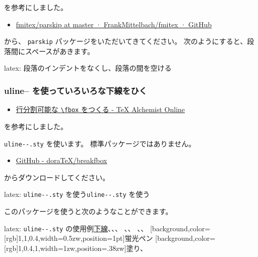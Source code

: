 \documentclass[dvipdfmx,a4j,14pt,uplatex]{jsarticle}
\begin{document}
を参考にしました。

\begin{itemize}
\item \href{https://github.com/FrankMittelbach/fmitex/tree/master/parskip}{fmitex/parskip at master · FrankMittelbach/fmitex · GitHub}
\end{itemize}

から、 \texttt{parskip} パッケージをいただいてきてください。
次のようにすると、段落間にスペースがあきます。


\begin{programlist}[label={orgb4fd86c}]{latex}{: 段落のインデントをなくし、段落の間を空ける}%
\usepackage[skip=1.2em]{parskip}
\end{programlist}

\subsubsection{uline-- を使っていろいろな下線をひく}
\label{sec:org8b065a0}

\begin{itemize}
\item \href{http://doratex.hatenablog.jp/entry/20171219/1513609345}{行分割可能な \texttt{\textbackslash{}fbox} をつくる - \TeX{} Alchemist Online}
\end{itemize}

を参考にしました。

\texttt{uline-{}-.sty} を使います。
標準パッケージではありません。

\begin{itemize}
\item \href{https://github.com/doraTeX/breakfbox}{GitHub - doraTeX/breakfbox}
\end{itemize}

からダウンロードしてください。

\begin{programlist}[label={org9b7d01c}]{latex}{: \texttt{uline-{}-.sty} を使う\texttt{uline-{}-.sty} を使う}\usepackage[usetype1]{uline--}
\end{programlist}

このパッケージを使うと次のようなことができます。

\begin{programlist}[label={org88e5984}]{latex}{: \texttt{uline-{}-.sty} の使用例}\uline{下線}、、、
、、
、、
\uline[background,color={[rgb]{1,1,0.4}},width=0.5zw,position=1pt]{蛍光ペン}
\uline[background,color={[rgb]{1,0.4,1}},width=1zw,position=.38zw]{塗り}、
\end{programlist}
\end{document}
